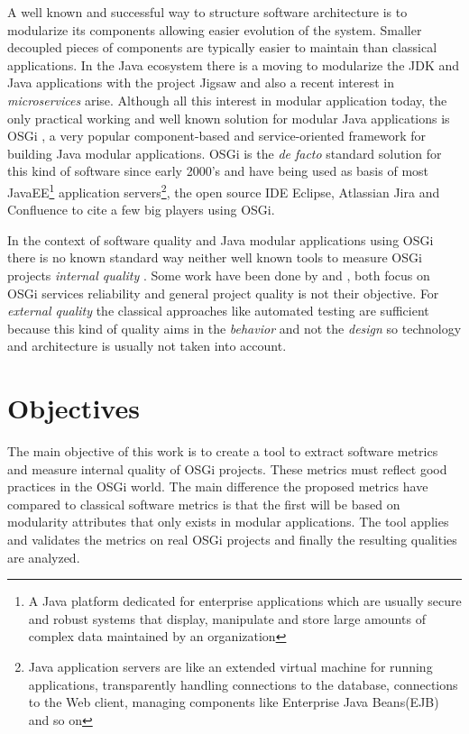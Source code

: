 A well known and successful way to structure software architecture is to modularize its components allowing easier evolution of the system. Smaller decoupled pieces of components are typically easier to maintain than classical applications. In the Java ecosystem there is a moving to modularize the JDK and Java applications with the project Jigsaw \citep{Krill 2012} and also a recent interest in \emph{microservices} \citep{Knorr 2014} arise. Although all this interest in modular application today, the only practical working and well known solution for modular Java applications is OSGi \citep{Hall 2011}, a very popular component-based and service-oriented framework for building Java modular applications. OSGi is the \emph{de facto} standard solution for this kind of software since early 2000's and have being used as basis of most JavaEE\footnote{A Java platform dedicated for enterprise applications which are usually secure and robust systems that display, manipulate and store large amounts of complex data maintained by an organization} application servers\footnote{Java application servers are like an extended virtual machine for running applications, transparently handling connections to the database, connections to the Web client, managing components like Enterprise Java Beans(EJB) and so on}, the open source IDE Eclipse\citep{eclipse 2006}, Atlassian Jira and Confluence to cite a few big players using OSGi. 

In the context of software quality and Java modular applications using OSGi there is no known standard way neither well known tools to measure OSGi projects \textit{internal quality} \citep{Hamza 2013} \citep{Wang 2012}. Some work have been done by \citep{Gama 2012} and \citep{Wang 2012}, both focus on OSGi services reliability and general project quality is not their objective. For \emph{external quality} the classical approaches like automated testing are sufficient because this kind of quality aims in the \emph{behavior} and not the \emph{design} so technology and architecture is usually not taken into account.

        
\section{Objectives}
The main objective of this work is to create a tool to extract software metrics and measure internal quality of OSGi projects. These metrics must reflect good practices in the OSGi world. The main difference the proposed metrics have compared to classical software metrics is that the first will be based on modularity attributes that only exists in modular applications. The tool applies and validates the metrics on real OSGi projects and finally the resulting qualities are analyzed.  

